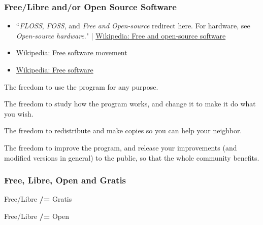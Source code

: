 \documentclass{beamer}
\begin{document}
\begin{frame}
\frametitle{Free/Libre and/or Open Source Software}
\vfill
\begin{itemize}
  \item ``\emph{FLOSS}, \emph{FOSS}, and \emph{Free and Open-source} redirect here. For hardware, see \emph{Open-source hardware}." | \href{https://en.wikipedia.org/wiki/Free_and_open-source_software}{Wikipedia: Free and open-source software}

  \vfill

  \item \href{https://en.wikipedia.org/wiki/Free_software_movement}{Wikipedia: Free software movement}

  \item \href{https://en.wikipedia.org/wiki/Free_software}{Wikipedia: Free software}
\end{itemize}

\vfill

\begin{description}
  \footnotesize
  \item[Freedom 0] The freedom to use the program for any purpose.
  \item[Freedom 1] The freedom to study how the program works, and change it to make it do what you wish.
  \item[Freedom 2] The freedom to redistribute and make copies so you can help your neighbor.
  \item[Freedom 3] The freedom to improve the program, and release your improvements (and modified versions in general) to the public, so that the whole community benefits.
\end{description}
\vfill
\end{frame}

\begin{frame}
\frametitle{Free, Libre, Open and Gratis}
\centering
\Huge
Free/Libre {\color{red}\bfseries/=} Gratis

\vfill

Free/Libre {\color{red}\bfseries/=} Open
\end{frame}
\end{document}

